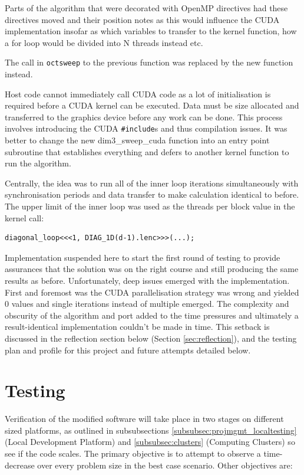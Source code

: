 \documentclass[conference]{IEEEtran}
\begin{document}
Parts of the algorithm that were decorated with OpenMP directives had these directives moved and their position notes as this would influence the CUDA implementation insofar as which variables to transfer to the kernel function, how a for loop would be divided into N threads instead etc.

The call in \texttt{octsweep} to the previous function was replaced by the new function instead.

Host code cannot immediately call CUDA code as a lot of initialisation is required before a CUDA kernel can be executed. Data must be size allocated and transferred to the graphics device before any work can be done. This process involves introducing the CUDA \texttt{\#include}s and thus compilation issues. It was better to change the new dim3\_sweep\_cuda function into an entry point subroutine that establishes everything and defers to another kernel function to run the algorithm.

Centrally, the idea was to run all of the inner loop iterations simultaneously with synchronisation periods and data transfer to make calculation identical to before. The upper limit of the inner loop was used as the threads per block value in the kernel call:

\begin{lstlisting}[breaklines]
diagonal_loop<<<1, DIAG_1D(d-1).lenc>>>(...);
\end{lstlisting}

Implementation suspended here to start the first round of testing to provide assurances that the solution was on the right course and still producing the same results as before. Unfortunately, deep issues emerged with the implementation. First and foremost was the CUDA parallelisation strategy was wrong and yielded 0 values and single iterations instead of multiple emerged. The complexity and obscurity of the algorithm and port added to the time pressures and ultimately a result-identical implementation couldn't be made in time. This setback is discussed in the reflection section below (Section \ref{sec:reflection}), and the testing plan and profile for this project and future attempts detailed below.



\section{Testing}
\label{sec:testing}

Verification of the modified software will take place in two stages on different sized platforms, as outlined in subsubsections \ref{subsubsec:projmgmt_localtesting} (Local Development Platform) and \ref{subsubsec:clusters} (Computing Clusters) so see if the code scales. The primary objective is to attempt to observe a time-decrease over every problem size in the best case scenario. Other objectives are:
\end{document}
